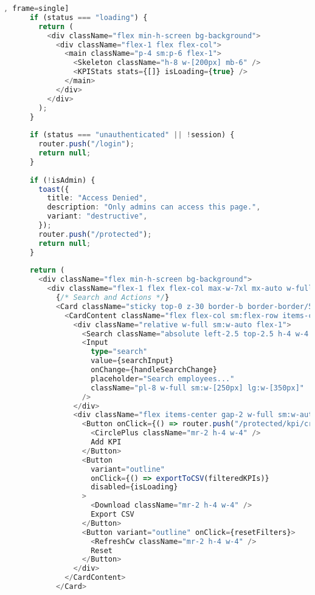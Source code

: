 \begin{lstlisting}[language=Typescript, caption=src/app/protected/kpi/page.tsx [front-end], frame=single]
      if (status === "loading") {
        return (
          <div className="flex min-h-screen bg-background">
            <div className="flex-1 flex flex-col">
              <main className="p-4 sm:p-6 flex-1">
                <Skeleton className="h-8 w-[200px] mb-6" />
                <KPIStats stats={[]} isLoading={true} />
              </main>
            </div>
          </div>
        );
      }
    
      if (status === "unauthenticated" || !session) {
        router.push("/login");
        return null;
      }
    
      if (!isAdmin) {
        toast({
          title: "Access Denied",
          description: "Only admins can access this page.",
          variant: "destructive",
        });
        router.push("/protected");
        return null;
      }
    
      return (
        <div className="flex min-h-screen bg-background">
          <div className="flex-1 flex flex-col max-w-7xl mx-auto w-full">
            {/* Search and Actions */}
            <Card className="sticky top-0 z-30 border-b border-border/50 bg-background/95 backdrop-blur supports-[backdrop-filter]:bg-background/60">
              <CardContent className="flex flex-col sm:flex-row items-center gap-4 p-4">
                <div className="relative w-full sm:w-auto flex-1">
                  <Search className="absolute left-2.5 top-2.5 h-4 w-4 text-muted-foreground" />
                  <Input
                    type="search"
                    value={searchInput}
                    onChange={handleSearchChange}
                    placeholder="Search employees..."
                    className="pl-8 w-full sm:w-[250px] lg:w-[350px]"
                  />
                </div>
                <div className="flex items-center gap-2 w-full sm:w-auto justify-between sm:justify-end">
                  <Button onClick={() => router.push("/protected/kpi/create")}>
                    <CirclePlus className="mr-2 h-4 w-4" />
                    Add KPI
                  </Button>
                  <Button
                    variant="outline"
                    onClick={() => exportToCSV(filteredKPIs)}
                    disabled={isLoading}
                  >
                    <Download className="mr-2 h-4 w-4" />
                    Export CSV
                  </Button>
                  <Button variant="outline" onClick={resetFilters}>
                    <RefreshCw className="mr-2 h-4 w-4" />
                    Reset
                  </Button>
                </div>
              </CardContent>
            </Card>
    

\end{lstlisting}

